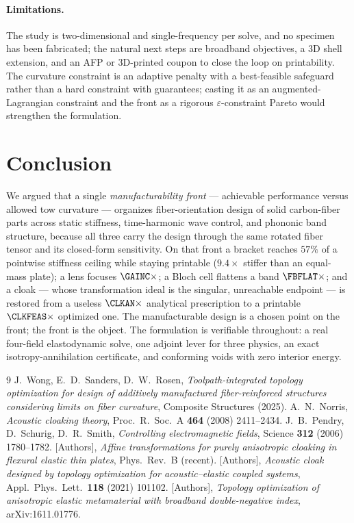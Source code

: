 \documentclass[preprint,11pt]{elsarticle}
\theoremstyle{plain}\newtheorem{proposition}{Proposition}
\theoremstyle{remark}\newtheorem{remark}{Remark}
\begin{document}
\paragraph{Limitations.} The study is two-dimensional and single-frequency per solve, and
no specimen has been fabricated; the natural next steps are broadband objectives, a 3D
shell extension, and an AFP or 3D-printed coupon to close the loop on printability. The
curvature constraint is an adaptive penalty with a best-feasible safeguard rather than a
hard constraint with guarantees; casting it as an augmented-Lagrangian constraint and the
front as a rigorous $\varepsilon$-constraint Pareto would strengthen the formulation.

\section{Conclusion}
\label{sec:concl}
We argued that a single \emph{manufacturability front} --- achievable performance versus
allowed tow curvature --- organizes fiber-orientation design of solid carbon-fiber parts
across static stiffness, time-harmonic wave control, and phononic band structure, because
all three carry the design through the same rotated fiber tensor and its closed-form
sensitivity. On that front a bracket reaches $57\%$ of a pointwise stiffness ceiling while
staying printable ($9.4\times$ stiffer than an equal-mass plate); a lens focuses
$\GAINC\times$; a Bloch cell flattens a band $\FBFLAT\times$; and a cloak --- whose
transformation ideal is the singular, unreachable endpoint --- is restored from a useless
$\CLKAN\times$ analytical prescription to a printable $\CLKFEAS\times$ optimized one. The
manufacturable design is a chosen point on the front; the front is the object. The
formulation is verifiable throughout: a real four-field elastodynamic solve, one adjoint
lever for three physics, an exact isotropy-annihilation certificate, and conforming voids
with zero interior energy.

\begin{thebibliography}{9}
 J.~Wong, E.~D.~Sanders, D.~W.~Rosen,
\emph{Toolpath-integrated topology optimization for design of additively manufactured
fiber-reinforced structures considering limits on fiber curvature}, Composite Structures
(2025).
 A.~N.~Norris, \emph{Acoustic cloaking theory}, Proc.\ R.\ Soc.\ A
\textbf{464} (2008) 2411--2434.
 J.~B.~Pendry, D.~Schurig, D.~R.~Smith,
\emph{Controlling electromagnetic fields}, Science \textbf{312} (2006) 1780--1782.
 [Authors], \emph{Affine transformations for purely anisotropic
cloaking in flexural elastic thin plates}, Phys.\ Rev.\ B (recent). %
 [Authors], \emph{Acoustic cloak designed by topology optimization for
acoustic--elastic coupled systems}, Appl.\ Phys.\ Lett.\ \textbf{118} (2021) 101102. %
 [Authors], \emph{Topology optimization of anisotropic elastic
metamaterial with broadband double-negative index}, arXiv:1611.01776. %
\end{thebibliography}
\end{document}
